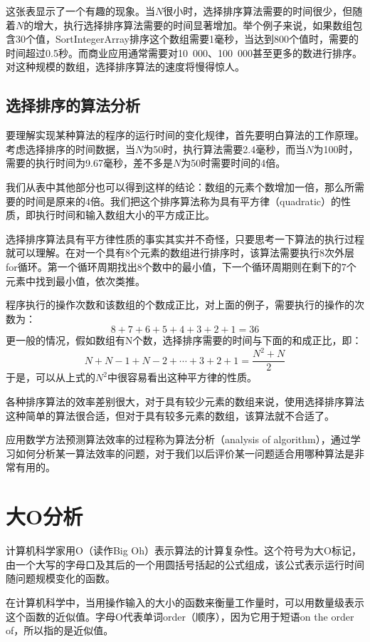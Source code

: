 这张表显示了一个有趣的现象。当$N$很小时，选择排序算法需要的时间很少，但随着$N$的增大，执行选择排序算法需要的时间显著增加。举个例子来说，如果数组包含30个值，SortIntegerArray排序这个数组需要1毫秒，当达到800个值时，需要的时间超过0.5秒。而商业应用通常需要对10~000、100~000甚至更多的数进行排序。对这种规模的数组，选择排序算法的速度将慢得惊人。

\section{选择排序的算法分析}

要理解实现某种算法的程序的运行时间的变化规律，首先要明白算法的工作原理。考虑选择排序的时间数据，当$N$为50时，执行算法需要2.4毫秒，而当$N$为100时，需要的执行时间为9.67毫秒，差不多是$N$为50时需要时间的4倍。

我们从表中其他部分也可以得到这样的结论：数组的元素个数增加一倍，那么所需要的时间是原来的4倍。我们把这个排序算法称为具有平方律（quadratic）的性质，即执行时间和输入数组大小的平方成正比。

选择排序算法具有平方律性质的事实其实并不奇怪，只要思考一下算法的执行过程就可以理解。在对一个具有8个元素的数组进行排序时，该算法需要执行8次外层for循环。第一个循环周期找出8个数中的最小值，下一个循环周期则在剩下的7个元素中找到最小值，依次类推。

程序执行的操作次数和该数组的个数成正比，对上面的例子，需要执行的操作的次数为：
\[8+7+6+5+4+3+2+1=36\]
更一般的情况，假如数组有N个数，选择排序需要的时间与下面的和成正比，即：
\[N+N-1+N-2+\cdots+3+2+1=\dfrac{N^2+N}{2}\]
于是，可以从上式的$N^2$中很容易看出这种平方律的性质。

各种排序算法的效率差别很大，对于具有较少元素的数组来说，使用选择排序算法这种简单的算法很合适，但对于具有较多元素的数组，该算法就不合适了。

应用数学方法预测算法效率的过程称为算法分析（analysis of algorithm），通过学习如何分析某一算法效率的问题，对于我们以后评价某一问题适合用哪种算法是非常有用的。



\chapter{大O分析}

计算机科学家用O（读作Big Oh）表示算法的计算复杂性。这个符号为大O标记，由一个大写的字母口及其后的一个用圆括号括起的公式组成，该公式表示运行时间随问题规模变化的函数。

在计算机科学中，当用操作输入的大小的函数来衡量工作量时，可以用数量级表示这个函数的近似值。字母O代表单词order（顺序），因为它用于短语on the order of，所以指的是近似值。

